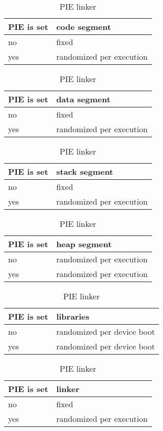  \begin{table}[hc]
    \begin{tabular}{| l | l |} \hline
        PIE is set & code segment \\ \hline
        no & fixed\\ \hline
        yes & randomized per execution \\ \hline
    \end{tabular}
    \caption{PIE executable segment \cite{iOSSec[5]}}
   \label{tab:PIE executable segment}

    \begin{tabular}{|p{2cm}|p{5cm}|} \hline
        PIE is set & data segment\\ \hline
        no & fixed\\ \hline
        yes & randomized per execution \\ \hline
    \end{tabular}
    \caption{PIE data segment \cite{iOSSec[5]}}
   \label{tab:PIE data segment}

    \begin{tabular}{|p{2cm}|p{5cm}|} \hline
        PIE is set & stack segment\\ \hline
        no & fixed \\ \hline
        yes & randomized per execution \\ \hline
    \end{tabular}
     \caption{PIE stack segment \cite{iOSSec[5]}}
   \label{tab:PIE stack segment}

    \begin{tabular}{|p{2cm}|p{5cm}|} \hline
        PIE is set & heap segment\\ \hline
        no & randomized per execution\\ \hline
        yes & randomized per execution \\ \hline
    \end{tabular}
    \caption{PIE heap segment \cite{iOSSec[5]}}
   \label{tab:PIE heap segment}

    \begin{tabular}{|p{2cm}|p{5cm}|} \hline
        PIE is set & libraries \\ \hline
        no & randomized per device boot\\ \hline
        yes & randomized per device boot \\ \hline
    \end{tabular}
    \caption{PIE libraries \cite{iOSSec[5]}}
   \label{tab:PIE libraries}

    \begin{tabular}{|p{2cm}|p{5cm}|} \hline
        PIE is set & linker  \\ \hline
        no & fixed\\ \hline
        yes & randomized per execution \\ \hline
    \end{tabular}
    \caption{PIE linker \cite{iOSSec[5]} }
   \label{tab:PIE linker }
\end{table}

